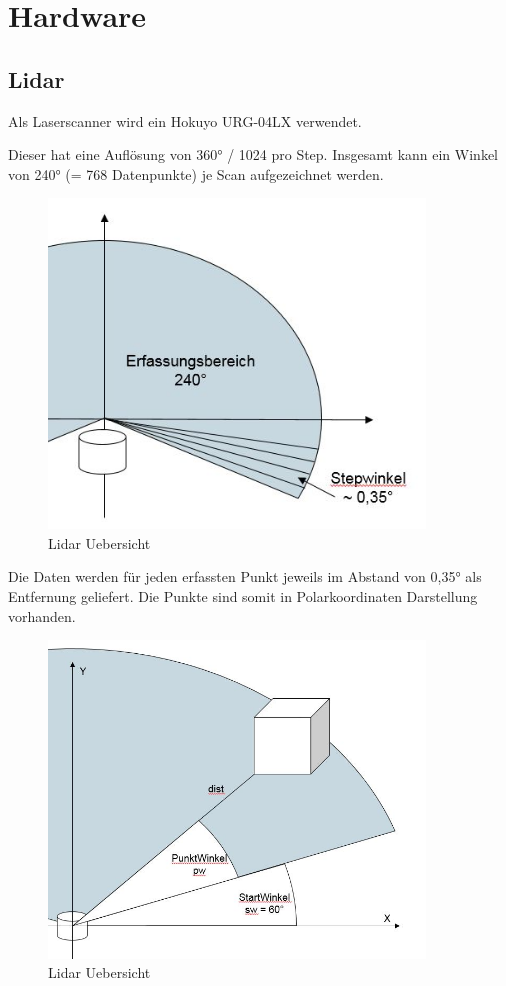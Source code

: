 \chapter{Hardware}

\section{Lidar}

Als Laserscanner wird ein Hokuyo URG-04LX verwendet.

Dieser hat eine Auflösung von 360° / 1024 pro Step. Insgesamt kann ein Winkel von 240° (= 768 Datenpunkte) je Scan aufgezeichnet werden.

\begin{figure}[h]
\begin{center}
\includegraphics[width=10cm]{images/chapter5/LidarHardware.jpg}
\caption{Lidar Uebersicht}
\label{Lidar_uebersicht}
\end{center}
\end{figure}

Die Daten werden für jeden erfassten Punkt jeweils im Abstand von 0,35° als Entfernung geliefert. Die Punkte sind somit in Polarkoordinaten Darstellung vorhanden.

\begin{figure}[h]
\begin{center}
\includegraphics[width=10cm]{images/chapter5/LidarWinkeluebersicht.jpg}
\caption{Lidar Uebersicht}
\label{Lidar_uebersicht}
\end{center}
\end{figure}

